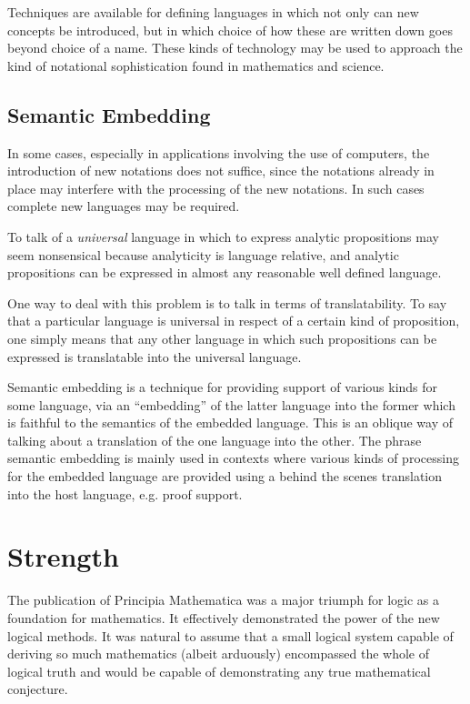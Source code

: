 Techniques are available for defining languages in which not only can new concepts be introduced, but in which choice of how these are written down goes beyond choice of a name.
These kinds of technology may be used to approach the kind of notational sophistication found in mathematics and science.

\subsection{Semantic Embedding}

In some cases, especially in applications involving the use of computers, the introduction of new notations does not suffice, since the notations already in place may interfere with the processing of the new notations.
In such cases complete new languages may be required.

To talk of a {\it universal} language in which to express analytic propositions may seem nonsensical because analyticity is language relative, and analytic propositions can be expressed in almost any reasonable well defined language.

One way to deal with this problem is to talk in terms of translatability.
To say that a particular language is universal in respect of a certain kind of proposition, one simply means that any other language in which such propositions can be expressed is translatable into the universal language.

Semantic embedding is a technique for providing support of various kinds for some language, via an ``embedding'' of the latter language into the former which is faithful to the semantics of the embedded language.
This is an oblique way of talking about a translation of the one language into the other.
The phrase semantic embedding is mainly used in contexts where various kinds of processing for the embedded language are provided using a behind the scenes translation into the host language, e.g. proof support.

\section{Strength}

The publication of Principia Mathematica was a major triumph for logic as a foundation for mathematics.
It effectively demonstrated the power of the new logical methods.
It was natural to assume that a small logical system capable of deriving so much mathematics (albeit arduously) encompassed the whole of logical truth and would be capable of demonstrating any true mathematical conjecture.

